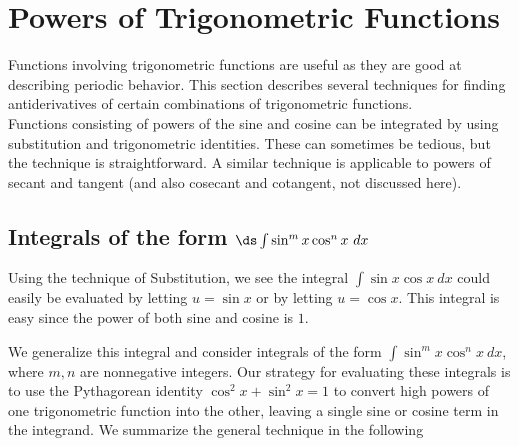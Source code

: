 \section{Powers of Trigonometric Functions}{}{}\label{sec:Powers of trigonometric functions}
Functions involving trigonometric functions are useful as they are good at describing periodic behavior. %
 This section describes several techniques for finding antiderivatives of certain combinations of trigonometric functions.\\


Functions consisting of powers of the sine and cosine can be
integrated by using substitution and trigonometric identities. These
can sometimes be tedious, but the technique is straightforward. A similar 
technique is applicable to powers of secant and tangent (and also cosecant 
and cotangent, not discussed here).


\subsection*{Integrals of the form $\ds \int \sin^m x\cos^n x\ dx$}



Using the technique of Substitution, we see the integral $\int \sin x\cos x\ dx$  could easily be evaluated  by letting $u=\sin x$ or by letting $u = \cos x$. This integral is easy since the power of both sine and cosine is $ 1 $.

We generalize this integral and consider integrals of the form $\int \sin^mx\cos^nx\ dx$, where $m,n$ are nonnegative integers. Our strategy for evaluating these integrals is to use the Pythagorean identity $\cos^2x+\sin^2x=1$ to convert high powers of one trigonometric function into the other, leaving a single sine or cosine term in the integrand. We summarize the general technique in the following



